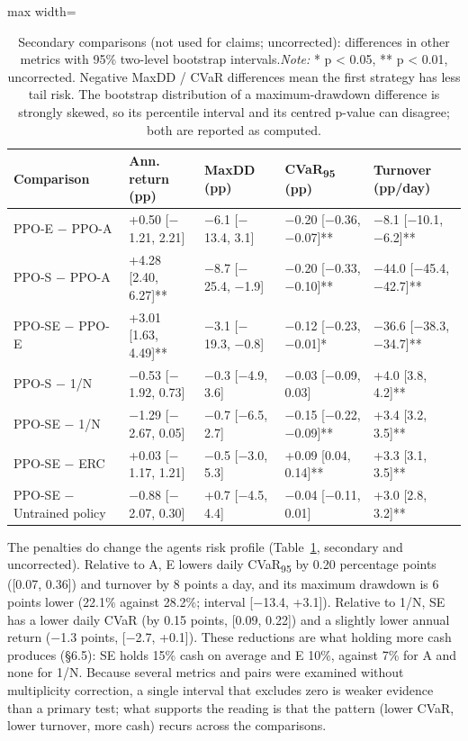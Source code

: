 \documentclass[11pt]{article}
\begin{document}
\begin{table}[!htbp]
\centering\scriptsize
\caption{Secondary comparisons (not used for claims; uncorrected): differences in other metrics with 95\% two-level bootstrap intervals.\label{tab-secondary-no} \emph{Note:} * p \textless{} 0.05, ** p \textless{} 0.01, uncorrected. Negative MaxDD / CVaR differences mean the first strategy has less tail risk. The bootstrap distribution of a maximum-drawdown difference is strongly skewed, so its percentile interval and its centred p-value can disagree; both are reported as computed.}
\begin{adjustbox}{max width=\linewidth}
\begin{tabular}{@{}lllll@{}}
\toprule
Comparison & Ann. return (pp) & MaxDD (pp) & CVaR\textsubscript{95} (pp) & Turnover (pp/day) \\
\midrule
PPO-E $-$ PPO-A & +0.50 {[}$-$1.21, 2.21{]} & $-$6.1 {[}$-$13.4, 3.1{]} & $-$0.20 {[}$-$0.36, $-$0.07{]}** & $-$8.1 {[}$-$10.1, $-$6.2{]}** \\
PPO-S $-$ PPO-A & +4.28 {[}2.40, 6.27{]}** & $-$8.7 {[}$-$25.4, $-$1.9{]} & $-$0.20 {[}$-$0.33, $-$0.10{]}** & $-$44.0 {[}$-$45.4, $-$42.7{]}** \\
PPO-SE $-$ PPO-E & +3.01 {[}1.63, 4.49{]}** & $-$3.1 {[}$-$19.3, $-$0.8{]} & $-$0.12 {[}$-$0.23, $-$0.01{]}* & $-$36.6 {[}$-$38.3, $-$34.7{]}** \\
PPO-S $-$ 1/N & $-$0.53 {[}$-$1.92, 0.73{]} & $-$0.3 {[}$-$4.9, 3.6{]} & $-$0.03 {[}$-$0.09, 0.03{]} & +4.0 {[}3.8, 4.2{]}** \\
PPO-SE $-$ 1/N & $-$1.29 {[}$-$2.67, 0.05{]} & $-$0.7 {[}$-$6.5, 2.7{]} & $-$0.15 {[}$-$0.22, $-$0.09{]}** & +3.4 {[}3.2, 3.5{]}** \\
PPO-SE $-$ ERC & +0.03 {[}$-$1.17, 1.21{]} & $-$0.5 {[}$-$3.0, 5.3{]} & +0.09 {[}0.04, 0.14{]}** & +3.3 {[}3.1, 3.5{]}** \\
PPO-SE $-$ Untrained policy & $-$0.88 {[}$-$2.07, 0.30{]} & +0.7 {[}$-$4.5, 4.4{]} & $-$0.04 {[}$-$0.11, 0.01{]} & +3.0 {[}2.8, 3.2{]}** \\
\bottomrule
\end{tabular}
\end{adjustbox}
\end{table}

The penalties do change the agents\textquotesingle{} risk profile (Table~\ref{tab-secondary-no}, secondary and uncorrected). Relative to A, E lowers daily CVaR\textsubscript{95} by 0.20 percentage points ({[}0.07, 0.36{]}) and turnover by 8 points a day, and its maximum drawdown is 6 points lower (22.1\% against 28.2\%; interval {[}$-$13.4, +3.1{]}). Relative to 1/N, SE has a lower daily CVaR (by 0.15 points, {[}0.09, 0.22{]}) and a slightly lower annual return ($-$1.3 points, {[}$-$2.7, +0.1{]}). These reductions are what holding more cash produces (\S{}6.5): SE holds 15\% cash on average and E 10\%, against 7\% for A and none for 1/N. Because several metrics and pairs were examined without multiplicity correction, a single interval that excludes zero is weaker evidence than a primary test; what supports the reading is that the pattern (lower CVaR, lower turnover, more cash) recurs across the comparisons.
\end{document}
